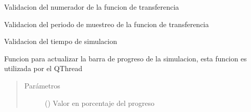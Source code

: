 \documentclass[letterpaper,10pt,spanish]{sphinxmanual}
\begin{document}

\begin{fulllineitems}
\label{\detokenize{codigos/simulacionHandler:simulacionHandler.tfnum_validator}}
Validacion del numerador de la funcion de transferencia

\end{fulllineitems}


\begin{fulllineitems}
\label{\detokenize{codigos/simulacionHandler:simulacionHandler.tfperiodo_validator}}
Validacion del periodo de muestreo de la funcion de transferencia

\end{fulllineitems}


\begin{fulllineitems}
\label{\detokenize{codigos/simulacionHandler:simulacionHandler.tiempo_validator}}
Validacion del tiempo de simulacion

\end{fulllineitems}


\begin{fulllineitems}
\label{\detokenize{codigos/simulacionHandler:simulacionHandler.update_progresBar_function}}
Funcion para actualizar la barra de progreso de la simulacion, esta funcion es utilizada por el QThread
\begin{quote}\begin{description}
\item[{Parámetros}] \leavevmode
{} () \textendash{} Valor en porcentaje del progreso

\end{description}\end{quote}

\end{fulllineitems}
\end{document}
